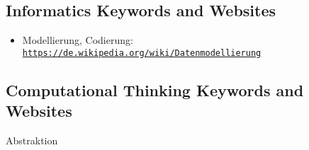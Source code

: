\documentclass[a4paper,11pt]{report}
\newcommand{\BrochureUrlText}[1]{\texttt{#1}}
\begin{document}
\subsection*{Informatics Keywords and Websites}

\begin{itemize}
  \item Modellierung, Codierung: \href{https://de.wikipedia.org/wiki/Datenmodellierung}{\BrochureUrlText{https://de.wikipedia.org/wiki/Datenmodellierung}}
\end{itemize}


\subsection*{Computational Thinking Keywords and Websites}

Abstraktion
\end{document}
